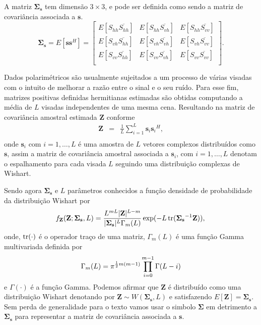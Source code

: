 A  matriz $\mathbf \Sigma_{{\mathbf s}}$ tem dimensão $3\times 3$, e pode ser definida como sendo a matriz de covariância associada a $\mathbf{s}$.
\begin{equation}\label{cap_acf_7}
\mathbf{\Sigma_{{\mathbf s}}} = E[\mathbf{s}\mathbf{s}^H] =
\left[
\begin{array}{ccc}
	E[S_{hh}\overline{S_{hh}}] & E[S_{hh} \overline{S_{vh}}] & E[S_{hh}  \overline{S_{vv}}]     \\
	E[S_{vh} \overline{S_{hh}}]  & E[S_{vh} \overline{S_{vh}}]  & E[S_{vh} \overline{S_{vv}}]      \\
	E[S_{vv} \overline{S_{hh}}]  & E[S_{vv} \overline{S_{vh}}]  & E[S_{vv}  \overline{S_{vv}}]     \\
\end{array}
\right].  
\end{equation}

Dados polarimétricos são usualmente sujeitados a um processo de várias visadas com o intuito de melhorar a razão entre o sinal e o seu ruído. Para esse fim, matrizes positivas definidas hermitianas estimadas são obtidas computando a média de $L$ visadas independentes de uma mesma cena. Resultando na matriz de covariância amostral estimada {\bf Z} conforme \citep{good, ade}
\begin{equation}\label{cap_acf_8}
\begin{array}{ccc}
    \mathbf{Z}&=&\frac{1}{L}\displaystyle{\sum_{i=1}^{L} {\mathbf{s}_i}{\mathbf{s}_i}^H}, \\
\end{array}
\end{equation}
onde $\mathbf{s}_i$ com $i = 1, \dots, L$ é uma amostra de $\mathit{L}$ vetores complexos distribuídos como $\mathbf{s}$, assim a matriz de covariância amostral associada a $\mathbf{s}_i$, com $i=1,\dots,L$ denotam o espalhamento para cada visada $L$ seguindo uma distribuição complexas de Wishart. 

Sendo agora $\mathbf{\Sigma_{s}}$ e $L$ parâmetros conhecidos a função densidade de probabilidade da distribuição Wishart por  
%
\begin{equation}\label{cap_acf_9}
    f_{\mathbf{Z}}(\mathbf{Z};\mathbf{\Sigma_{s}},L)=\frac{L^{mL}|\mathbf{Z}|^{L-m}}{|\mathbf{\Sigma_{s}}|^{L}\Gamma_m(L)} \exp(-L\operatorname{tr}(\mathbf{\Sigma_{s}}^{-1}\mathbf{Z})), \\
\end{equation}
onde, $\operatorname{tr}(\cdot)$ é o operador traço de uma matriz, $\Gamma_m(L)$ é uma função Gamma multivariada definida por
\begin{equation}\label{cap_acf_10}
	\Gamma_m(L)=\pi^{\frac{1}{2}m(m-1)} \prod_{i=0}^{m-1}\Gamma(L-i) \\
\end{equation}
e $\Gamma(\cdot)$ é a função Gamma. Podemos afirmar que $\mathbf{Z}$ é distribuído como uma distribuição Wishart denotando por $\mathbf{Z}\sim W(\mathbf{\Sigma_{s}}, L)$ e satisfazendo $E[\mathbf{Z}]=\mathbf{\Sigma_{s}}$. Sem perda de generalidade para o texto vamos usar o simbolo $\mathbf{\Sigma}$ em detrimento a $\mathbf{\Sigma_{s}}$ para representar a matriz de covariância associada a $\mathbf{s}$.

